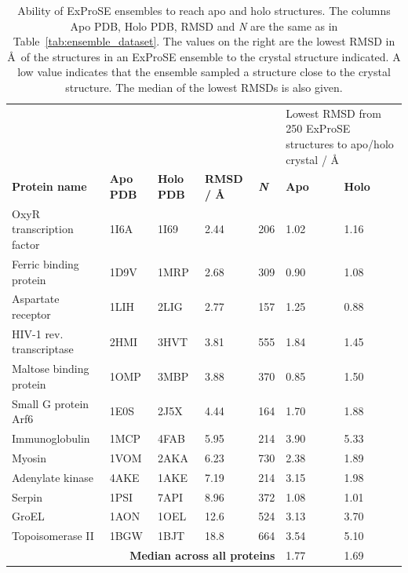 \begin{table}
\centering

\begin{footnotesize}
\begin{tabular}{ l l l l l l l }
\hline
 &  &  &  &  & \multicolumn{2}{p{3.5cm}}{Lowest RMSD from 250 ExProSE structures to apo/holo crystal / \AA} \\
\textbf{Protein name} & \textbf{Apo PDB} & \textbf{Holo PDB} & \textbf{RMSD / \AA} & \textit{\textbf{N}} & \textbf{Apo} & \textbf{Holo} \\
\hline
OxyR transcription factor & 1I6A & 1I69 & 2.44 & 206 & 1.02 & 1.16 \\
Ferric binding protein    & 1D9V & 1MRP & 2.68 & 309 & 0.90 & 1.08 \\
Aspartate receptor        & 1LIH & 2LIG & 2.77 & 157 & 1.25 & 0.88 \\
HIV-1 rev. transcriptase  & 2HMI & 3HVT & 3.81 & 555 & 1.84 & 1.45 \\
Maltose binding protein   & 1OMP & 3MBP & 3.88 & 370 & 0.85 & 1.50 \\
Small G protein Arf6      & 1E0S & 2J5X & 4.44 & 164 & 1.70 & 1.88 \\
Immunoglobulin            & 1MCP & 4FAB & 5.95 & 214 & 3.90 & 5.33 \\
Myosin                    & 1VOM & 2AKA & 6.23 & 730 & 2.38 & 1.89 \\
Adenylate kinase          & 4AKE & 1AKE & 7.19 & 214 & 3.15 & 1.98 \\
Serpin                    & 1PSI & 7API & 8.96 & 372 & 1.08 & 1.01 \\
GroEL                     & 1AON & 1OEL & 12.6 & 524 & 3.13 & 3.70 \\
Topoisomerase II          & 1BGW & 1BJT & 18.8 & 664 & 3.54 & 5.10 \\
\hline
\multicolumn{5}{r}{\textbf{Median across all proteins}} & 1.77  & 1.69 \\
\hline
\end{tabular}
\end{footnotesize}


\caption[Ability of ExProSE ensembles to sample conformational space]
{Ability of ExProSE ensembles to reach apo and holo structures.
The columns Apo PDB, Holo PDB, RMSD and \textit{N} are the same as in Table~\ref{tab:ensemble_dataset}.
The values on the right are the lowest RMSD in \AA\ of the structures in an ExProSE ensemble to the crystal structure indicated.
A low value indicates that the ensemble sampled a structure close to the crystal structure.
The median of the lowest RMSDs is also given.}

\label{tab:ensemble_dataset_ex}
\end{table}


